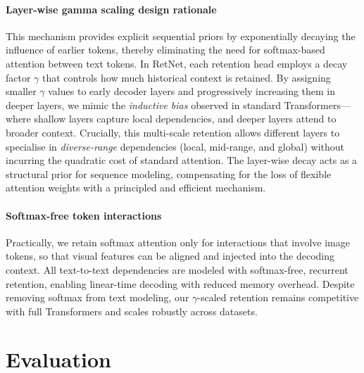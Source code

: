 \documentclass[times, review, 10pt]{elsarticle}
\begin{document}
\paragraph{Layer-wise gamma scaling design rationale}
This mechanism provides explicit sequential priors by exponentially decaying the influence of earlier tokens, thereby eliminating the need for softmax-based attention between text tokens. In RetNet, each retention head employs a decay factor $\gamma$ that controls how much historical context is retained. By assigning smaller $\gamma$ values to early decoder layers and progressively increasing them in deeper layers, we mimic the \emph{inductive bias} observed in standard Transformers---where shallow layers capture local dependencies, and deeper layers attend to broader context. Crucially, this multi-scale retention allows different layers to specialise in \emph{diverse-range} dependencies (local, mid-range, and global) without incurring the quadratic cost of standard attention. The layer-wise decay acts as a structural prior for sequence modeling, compensating for the loss of flexible attention weights with a principled and efficient mechanism.


\paragraph{Softmax-free token interactions}
Practically, we retain softmax attention only for interactions that involve image tokens, so that visual features can be aligned and injected into the decoding context. All text-to-text dependencies are modeled with softmax-free, recurrent retention, enabling linear-time decoding with reduced memory overhead. Despite removing softmax from text modeling, our $\gamma$-scaled retention remains competitive with full Transformers and scales robustly across datasets.


\section{Evaluation}
\label{sec:experiments}
\end{document}
